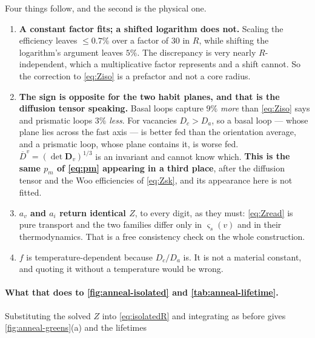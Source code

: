 \documentclass{article}
\newcommand{\Dten}{\bm D}
\begin{document}
Four things follow, and the second is the physical one.
\begin{enumerate}
\item \textbf{A constant factor fits; a shifted logarithm does not.} Scaling the
      efficiency leaves $\le0.7\%$ over a factor of $30$ in $R$, while shifting
      the logarithm's argument leaves $5\%$. The discrepancy is very nearly
      $R$-independent, which a multiplicative factor represents and a shift
      cannot. So the correction to \cref{eq:Ziso} is a prefactor and not a core
      radius.
\item \textbf{The sign is opposite for the two habit planes, and that is the
      diffusion tensor speaking.} Basal loops capture $9\%$ \emph{more} than
      \cref{eq:Ziso} says and prismatic loops $3\%$ \emph{less}. For vacancies
      $D_c>D_a$, so a basal loop --- whose plane lies across the fast axis --- is
      better fed than the orientation average, and a prismatic loop, whose plane
      contains it, is worse fed. $\overline D^{v}=(\det\Dten_v)^{1/3}$ is an
      invariant and cannot know which. \textbf{This is the same $p_m$ of
      \cref{eq:pm} appearing in a third place}, after the diffusion tensor and
      the Woo efficiencies of \cref{eq:Zsk}, and its appearance here is not
      fitted.
\item \textbf{$a_v$ and $a_i$ return identical $Z$}, to every digit, as they must:
      \cref{eq:Zread} is pure transport and the two families differ only in
      $\varsigma_s(v)$ and in their thermodynamics. That is a free consistency
      check on the whole construction.
\item $f$ is temperature-dependent because $D_c/D_a$ is. It is not a material
      constant, and quoting it without a temperature would be wrong.
\end{enumerate}

\paragraph{What that does to \cref{fig:anneal-isolated} and
\cref{tab:anneal-lifetime}.} Substituting the solved $Z$ into \cref{eq:isolatedR}
and integrating as before gives \cref{fig:anneal-greens}(a) and the lifetimes
\end{document}
